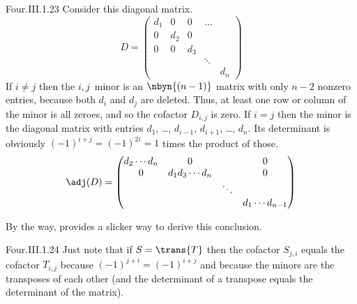 \begin{ans}{Four.III.1.23}
      Consider this diagonal matrix.
      \begin{equation*}
        D=
        \begin{pmatrix}
          d_1  &0   &0   &\ldots    \\
          0    &d_2 &0   &          \\
          0    &0   &d_3            \\
               &    &    &\ddots    \\
               &    &    &      &d_n
        \end{pmatrix}
      \end{equation*}
      If $i\neq j$ then the $i,j$~minor is an $\nbyn{(n-1)}$ matrix
      with only $n-2$ nonzero entries, because both $d_i$ and $d_j$ are
      deleted.
      Thus, at least one row or column of the minor is all zeroes, and
      so the cofactor $D_{i,j}$ is zero.
      If $i=j$ then the minor is the diagonal matrix with entries
      $d_1$, \ldots, $d_{i-1}$, $d_{i+1}$, \ldots, $d_n$.
      Its determinant is obviously $(-1)^{i+j}=(-1)^{2i}=1$
      times the product of those.
      \begin{equation*}
        \adj(D)
        =
        \begin{pmatrix}
          d_2\cdots d_n    &0                 &      &0    \\
          0                &d_1d_3\cdots d_n  &      &0    \\
                           &                  &\ddots      \\
                           &                  &       &d_1\cdots d_{n-1}
        \end{pmatrix}
      \end{equation*}

      By the way,  provides
      a slicker way to derive this conclusion.
    
\end{ans}
\begin{ans}{Four.III.1.24}
      Just note that if $S=\trans{T}$ then the cofactor
      $S_{j,i}$ equals the cofactor $T_{i,j}$ because $(-1)^{j+i}=(-1)^{i+j}$
      and because the minors are the transposes of each other (and the
      determinant of a transpose equals the determinant of the matrix).
    
\end{ans}
